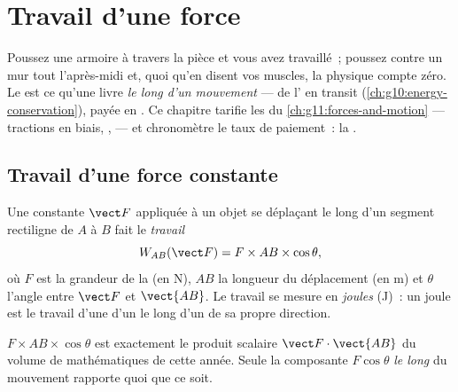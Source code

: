 \chapter{Travail d'une force}\label{ch:g11:work-of-force}

Poussez une armoire à travers la pièce et vous avez travaillé~; poussez
contre un mur tout l'après-midi et, quoi qu'en disent vos muscles, la
physique compte zéro. Le  est ce
qu'une  livre \emph{le long d'un
mouvement} --- de l' en
transit (\cref{ch:g10:energy-conservation}), payée en
. Ce chapitre tarifie les
 du
\cref{ch:g11:forces-and-motion} --- tractions en biais,
,
 --- et chronomètre le taux de
paiement~: la .

\section{Travail d'une force constante}

\begin{definition}\label{def:g11:work-of-force:work}
Une  constante $\vect F$ appliquée à un
objet se déplaçant le long d'un segment rectiligne de $A$ à $B$ fait le
\emph{travail}
\[
W_{AB}(\vect F) = F \times AB \times \cos\theta ,
\]
où $F$ est la grandeur de la  (en
\unit{N}), $AB$ la longueur du déplacement (en \unit{m}) et $\theta$
l'angle entre $\vect F$ et $\vect{AB}$. Le travail se mesure en
\emph{joules} (\unit{J})~: un joule est le travail d'une
 d'un  le long d'un
 de sa propre direction.
\end{definition}

\begin{remark}\label{rem:g11:work-of-force:scal}
$F \times AB \times \cos\theta$ est exactement le produit scalaire
$\vect F \cdot \vect{AB}$ du volume de mathématiques de cette année.
Seule la composante $F\cos\theta$ \emph{le long} du mouvement rapporte
quoi que ce soit.
\end{remark}

